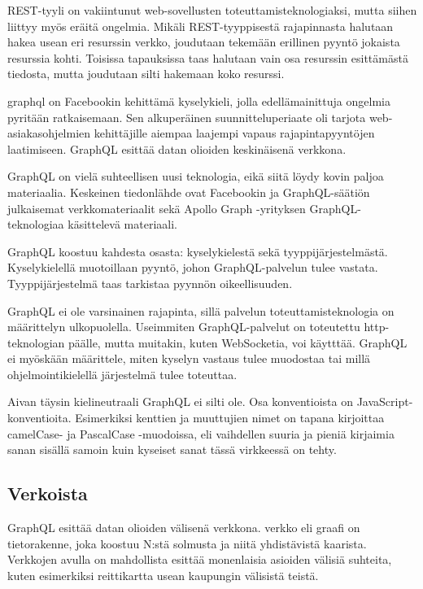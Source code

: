 REST-tyyli on vakiintunut web-sovellusten toteuttamisteknologiaksi,
mutta siihen liittyy myös eräitä ongelmia. Mikäli REST-tyyppisestä
rajapinnasta halutaan hakea usean eri resurssin verkko, joudutaan
tekemään erillinen pyyntö jokaista resurssia kohti. Toisissa tapauksissa
taas halutaan vain osa resurssin esittämästä tiedosta, mutta joudutaan
silti hakemaan koko resurssi.
\cites{betterRESTPrisma}{WhyUseGraphQLApollo}

\gls{graphql} on Facebookin kehittämä kyselykieli, jolla
edellämainittuja ongelmia pyritään ratkaisemaan. Sen alkuperäinen
suunnitteluperiaate oli tarjota web-asiakasohjelmien kehittäjille
aiempaa laajempi vapaus rajapintapyyntöjen laatimiseen. GraphQL esittää
datan olioiden keskinäisenä verkkona. \cite{graphql:spec}

GraphQL on vielä suhteellisen uusi teknologia, eikä siitä löydy kovin
paljoa materiaalia. Keskeinen tiedonlähde ovat
Facebookin\cite{graphql:spec} ja GraphQL-säätiön\cite{GraphQLOrg}
julkaisemat verkkomateriaalit sekä Apollo Graph -yrityksen
GraphQL-teknologiaa käsittelevä materiaali. \cite{ApolloGraphQL}

GraphQL koostuu kahdesta osasta: kyselykielestä sekä
tyyppijärjestelmästä. Kyselykielellä muotoillaan pyyntö, johon
GraphQL-palvelun tulee vastata. Tyyppijärjestelmä taas tarkistaa pyynnön
oikeellisuuden.

GraphQL ei ole varsinainen rajapinta, sillä palvelun
toteuttamisteknologia on määrittelyn ulkopuolella. Useimmiten
GraphQL-palvelut on toteutettu \gls{http}-teknologian päälle, mutta
muitakin, kuten WebSocketia, voi käytttää. GraphQL ei myöskään
määrittele, miten kyselyn vastaus tulee muodostaa tai millä
ohjelmointikielellä järjestelmä tulee toteuttaa.

Aivan täysin kielineutraali GraphQL ei silti ole. Osa konventioista on
JavaScript-konventioita. Esimerkiksi kenttien ja muuttujien nimet on
tapana kirjoittaa camelCase- ja PascalCase -muodoissa, eli vaihdellen
suuria ja pieniä kirjaimia sanan sisällä samoin kuin kyseiset sanat
tässä virkkeessä on tehty. \cite{GraphQLSchemaBasics}

\hypertarget{verkoista}{%
\subsection{Verkoista}\label{verkoista}}

GraphQL esittää datan olioiden välisenä verkkona. \Gls{verkko} eli
graafi on tietorakenne, joka koostuu N:stä solmusta ja niitä
yhdistävistä kaarista. \cite{pozrikidis2014introduction} Verkkojen
avulla on mahdollista esittää monenlaisia asioiden välisiä suhteita,
kuten esimerkiksi reittikartta usean kaupungin välisistä teistä.

